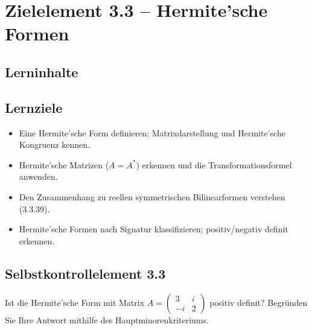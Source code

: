 \documentclass[a4paper,12pt]{article}
\begin{document}
\newpage

\section*{Zielelement 3.3 -- Hermite'sche Formen}

\subsection*{Lerninhalte}
\begin{center}
\end{center}

\subsection*{Lernziele}
\begin{itemize}
  \item Eine Hermite'sche Form definieren; Matrixdarstellung und Hermite'sche Kongruenz kennen.
  \item Hermite'sche Matrizen ($A = A^*$) erkennen und die Transformationsformel anwenden.
  \item Den Zusammenhang zu reellen symmetrischen Bilinearformen verstehen (3.3.39).
  \item Hermite'sche Formen nach Signatur klassifizieren; positiv/negativ definit erkennen.
\end{itemize}

\subsection*{Selbstkontrollelement 3.3}
Ist die Hermite'sche Form mit Matrix $A = \begin{pmatrix}3 & i \\ -i & 2\end{pmatrix}$ positiv definit?
Begründen Sie Ihre Antwort mithilfe des Hauptminorenkriteriums.
\end{document}
